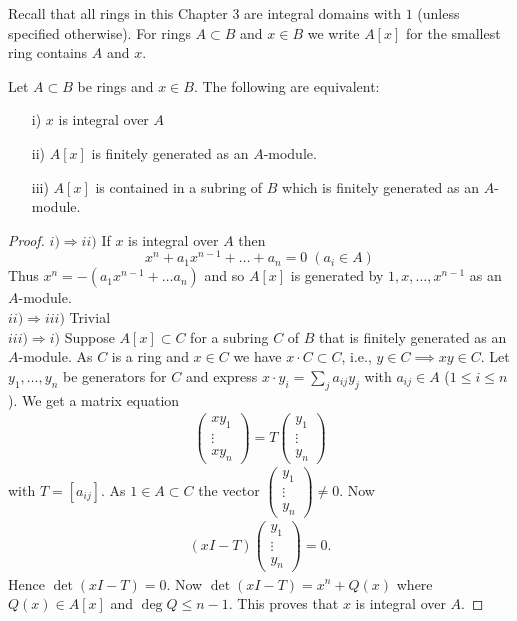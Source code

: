 \documentclass[NumTh.tex]{subfiles}
\begin{document}
Recall that all rings in this Chapter 3 are integral domains with $1$ (unless specified otherwise).
For rings $A \subset B$ and $x \in B$ we write $A[x]$ for the smallest ring contains $A$ and $x$.

\begin{theorem}[3.3.2\label{th_3_3_2}]
  Let $A \subset B$ be rings and $x \in B$.
  The following are equivalent:
  \begin{enumerate}
    \item[i)] $x$ is integral over $A$
    \item[ii)] $A[x]$ is finitely generated as an $A$-module.
    \item[iii)] $A[x]$ is contained in a subring of $B$ which is finitely generated as an $A$-module.
  \end{enumerate}
\end{theorem}

\begin{proof}
  $i) \Rightarrow ii)$  If $x$ is integral over $A$ then
  \[ x^n + a_1 x^{n-1} + \dots + a_n = 0 \; (a_i \in A) \]
  Thus $x^n = - (a_1x^{n-1} + \dots a_n)$ and so $A[x]$ is generated by $1,x,\dots,x^{n-1}$ as an $A$-module. \\
  $ii) \Rightarrow iii)$ Trivial \\
  $iii) \Rightarrow i)$ Suppose $A[x] \subset C$ for a subring $C$ of $B$ that is finitely generated as an $A$-module.
  As $C$ is a ring and $x \in C$ we have $x \cdot C \subset C$, i.e., $y \in C \implies xy \in C$.
  Let $y_1,\dots,y_n$ be generators for $C$ and express $x \cdot y_i = \sum_{j} a_{ij}y_j$ with $a_{ij} \in A$ ($1 \leq i \leq n$).
  We get a matrix equation 
  \begin{align*}
    \begin{pmatrix}
      xy_1 \\
      \vdots \\
      xy_n
    \end{pmatrix}
    = T
    \begin{pmatrix}
      y_1 \\
      \vdots \\
      y_n
    \end{pmatrix}
  \end{align*}
  with $T = [a_{ij}]$.
  As $1 \in A \subset C$ the vector $
  \begin{pmatrix}
    y_1 \\
    \vdots \\
    y_n
  \end{pmatrix}
  \neq 0$.
  Now
  \begin{align*}
    (xI - T) 
    \begin{pmatrix}
      y_1 \\
      \vdots \\
      y_n
    \end{pmatrix}
    = 0 \text{.}
  \end{align*}
  Hence $\det(xI -T) = 0$.
  Now $\det(xI - T) = x^n + Q(x)$ where $Q(x) \in A[x]$ and $\deg Q \leq n-1$.
  This proves that $x$ is integral over $A$.
\end{proof}
\end{document}
